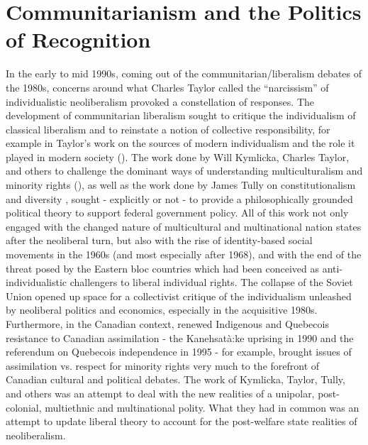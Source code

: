 \documentclass[12pt,oneside]{memoir}
\begin{document}
\section*{Communitarianism and the Politics of Recognition}

	In the early to mid 1990s, coming out of the communitarian/liberalism debates of the 1980s,  concerns around what Charles Taylor called the ``narcissism'' of individualistic neoliberalism provoked a constellation of responses. The  development of communitarian liberalism sought to critique the individualism of classical liberalism and to reinstate a notion of collective responsibility, for example in Taylor's work on the sources of modern individualism and the role it played in modern society (\cite{Taylor1989, Taylor1991}). The work done by Will Kymlicka, Charles Taylor, and others to challenge the dominant ways of understanding multiculturalism and minority rights (\cite{kymlicka-1995, Taylor1994, honneth-struggle, Fraser1997}), as well as the work done by James Tully on constitutionalism and diversity \citep{tully-strange}, sought - explicitly or not - to provide a philosophically grounded political theory to support federal government policy. All of this work not only engaged with the changed nature of multicultural and multinational nation states after the neoliberal turn, but also with the rise of identity-based social movements in the 1960s (and most especially after 1968), and with the end of the threat posed by the Eastern bloc countries which had been conceived as anti-individualistic challengers to liberal individual rights. The collapse of the Soviet Union opened up space for a collectivist critique of the individualism unleashed by neoliberal politics and economics, especially in the acquisitive 1980s. Furthermore, in the Canadian context, renewed Indigenous and Quebecois resistance to Canadian assimilation - the Kanehsatà:ke uprising in 1990 and the referendum on Quebecois independence in 1995 - for example, brought issues of assimilation vs. respect for minority rights very much to the forefront of Canadian cultural and political debates. The work of Kymlicka, Taylor, Tully, and others was an attempt to deal with the new realities of a unipolar, post-colonial, multiethnic and multinational polity. What they had in common was an attempt to update liberal theory to account for the post-welfare state realities of neoliberalism.
\end{document}
